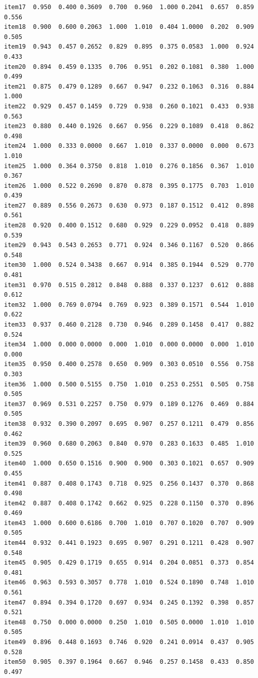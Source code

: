 \documentclass[
  a4paper,
]{ltjsbook}
\begin{document}
\begin{verbatim}
item17  0.950  0.400 0.3609  0.700  0.960  1.000 0.2041  0.657  0.859  0.556
item18  0.900  0.600 0.2063  1.000  1.010  0.404 1.0000  0.202  0.909  0.505
item19  0.943  0.457 0.2652  0.829  0.895  0.375 0.0583  1.000  0.924  0.433
item20  0.894  0.459 0.1335  0.706  0.951  0.202 0.1081  0.380  1.000  0.499
item21  0.875  0.479 0.1289  0.667  0.947  0.232 0.1063  0.316  0.884  1.000
item22  0.929  0.457 0.1459  0.729  0.938  0.260 0.1021  0.433  0.938  0.563
item23  0.880  0.440 0.1926  0.667  0.956  0.229 0.1089  0.418  0.862  0.498
item24  1.000  0.333 0.0000  0.667  1.010  0.337 0.0000  0.000  0.673  1.010
item25  1.000  0.364 0.3750  0.818  1.010  0.276 0.1856  0.367  1.010  0.367
item26  1.000  0.522 0.2690  0.870  0.878  0.395 0.1775  0.703  1.010  0.439
item27  0.889  0.556 0.2673  0.630  0.973  0.187 0.1512  0.412  0.898  0.561
item28  0.920  0.400 0.1512  0.680  0.929  0.229 0.0952  0.418  0.889  0.539
item29  0.943  0.543 0.2653  0.771  0.924  0.346 0.1167  0.520  0.866  0.548
item30  1.000  0.524 0.3438  0.667  0.914  0.385 0.1944  0.529  0.770  0.481
item31  0.970  0.515 0.2812  0.848  0.888  0.337 0.1237  0.612  0.888  0.612
item32  1.000  0.769 0.0794  0.769  0.923  0.389 0.1571  0.544  1.010  0.622
item33  0.937  0.460 0.2128  0.730  0.946  0.289 0.1458  0.417  0.882  0.524
item34  1.000  0.000 0.0000  0.000  1.010  0.000 0.0000  0.000  1.010  0.000
item35  0.950  0.400 0.2578  0.650  0.909  0.303 0.0510  0.556  0.758  0.303
item36  1.000  0.500 0.5155  0.750  1.010  0.253 0.2551  0.505  0.758  0.505
item37  0.969  0.531 0.2257  0.750  0.979  0.189 0.1276  0.469  0.884  0.505
item38  0.932  0.390 0.2097  0.695  0.907  0.257 0.1211  0.479  0.856  0.462
item39  0.960  0.680 0.2063  0.840  0.970  0.283 0.1633  0.485  1.010  0.525
item40  1.000  0.650 0.1516  0.900  0.900  0.303 0.1021  0.657  0.909  0.455
item41  0.887  0.408 0.1743  0.718  0.925  0.256 0.1437  0.370  0.868  0.498
item42  0.887  0.408 0.1742  0.662  0.925  0.228 0.1150  0.370  0.896  0.469
item43  1.000  0.600 0.6186  0.700  1.010  0.707 0.1020  0.707  0.909  0.505
item44  0.932  0.441 0.1923  0.695  0.907  0.291 0.1211  0.428  0.907  0.548
item45  0.905  0.429 0.1719  0.655  0.914  0.204 0.0851  0.373  0.854  0.481
item46  0.963  0.593 0.3057  0.778  1.010  0.524 0.1890  0.748  1.010  0.561
item47  0.894  0.394 0.1720  0.697  0.934  0.245 0.1392  0.398  0.857  0.521
item48  0.750  0.000 0.0000  0.250  1.010  0.505 0.0000  1.010  1.010  0.505
item49  0.896  0.448 0.1693  0.746  0.920  0.241 0.0914  0.437  0.905  0.528
item50  0.905  0.397 0.1964  0.667  0.946  0.257 0.1458  0.433  0.850  0.497

\end{verbatim}
\end{document}
